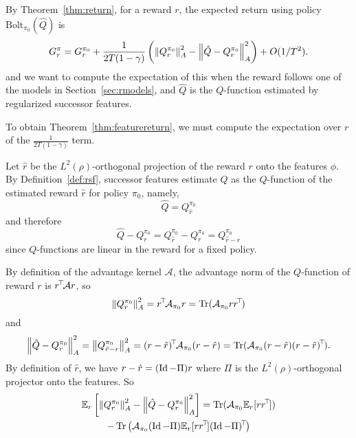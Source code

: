 \documentclass[11pt,a4paper]{article}
\newcommand{\Bol}{\mathrm{Bolt}_{\pi_0}}
\newcommand{\AK}{\mathcal{A}}
\begin{document}
\begin{dem}
By Theorem~\ref{thm:return}, for a reward $r$, the expected return using
policy $\Bol(\hat Q)$ is
\begin{equation}
G^{\pi}_r=G^{\pi_0}_r+\frac{1}{2T(1-\gamma)}
\left(\left\lVert Q^{\pi_0}_r\right\rVert^2_A-\left\lVert\hat Q-Q^{\pi_0}_r\right\rVert^2_A\right) +O(1/T^2).
\end{equation}
and we want to compute the expectation of this when the reward follows
one of the models in Section~\ref{sec:rmodels}, and $\hat Q$ is the
$Q$-function estimated by regularized successor features.

To obtain
Theorem~\ref{thm:featurereturn}, we must compute the expectation over $r$
of the $\frac{1}{2T(1-\gamma)}$ term.

Let $\hat r$ be the $L^2(\rho)$-orthogonal projection of the reward $r$
onto the features $\phi$. By Definition~\ref{def:rsf}, successor features estimate
$\hat Q$ as the $Q$-function of the estimated reward $\hat r$ for policy
$\pi_0$, namely,
\begin{equation}
\hat Q=Q^{\pi_0}_{\hat r}
\end{equation}
and therefore
\begin{equation}
\hat Q-Q^{\pi_0}_r=Q^{\pi_0}_{\hat r}-Q^{\pi_0}_r=Q^{\pi_0}_{\hat r-r}
\end{equation}
since $Q$-functions are linear in the reward for a fixed policy.

By definition of the advantage kernel $\AK$, the advantage norm of the
$Q$-function of reward $r$ is $\transp{r}\AK r$, so
\begin{equation}
\norm{Q^{\pi_0}_r}^2_A=\transp{r} \AK_{\pi_0}r=\Tr
(\AK_{\pi_0}r\transp{r})
\end{equation}
and
\begin{equation}
\norm{\hat Q-Q^{\pi_0}_r}^2_A=\norm{Q^{\pi_0}_{\hat r-r}}^2_A=
\transp{(r-\hat r)}\AK_{\pi_0} (r-\hat r)
=\Tr(\AK_{\pi_0}(r-\hat r)\transp{(r-\hat r)}).
\end{equation}
By definition of $\hat r$, we have $r-\hat r=(\operatorname{Id}-\Pi)r$ where $\Pi$ is
the $L^2(\rho)$-orthogonal projector onto the features. So
\begin{multline}
\label{eq:return_Err}
\E_r\left[\norm{Q^{\pi_0}_r}^2_A-\norm{\hat Q-Q^{\pi_0}_r}^2_A\right]=
\Tr(\AK_{\pi_0} \E_r [r\transp{r}])
\\-\Tr\left(\AK_{\pi_0} (\Id-\Pi)\E_r
[r\transp{r}] \transp{(\Id-\Pi)}\right)
\end{multline}



\end{dem}
\end{document}

